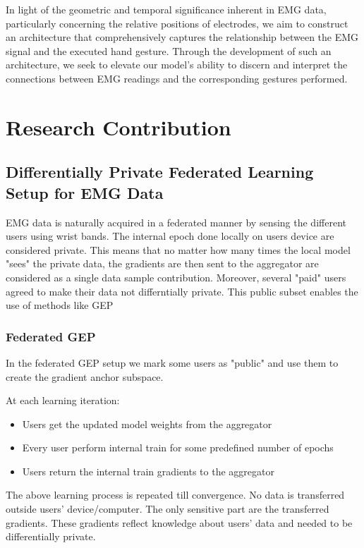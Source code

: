 \documentclass[fourier]{_style/dissertation}
\begin{document}

In light of the geometric and temporal significance inherent in EMG data, particularly concerning the relative positions of electrodes, we aim to construct an architecture that comprehensively captures the relationship between the EMG signal and the executed hand gesture. Through the development of such an architecture, we seek to elevate our model's ability to discern and interpret the connections between EMG readings and the corresponding gestures performed.

\chapter{Research Contribution}
\section{Differentially Private Federated Learning  Setup for EMG Data }
EMG data is naturally acquired in a federated manner by sensing the different users using wrist bands. The internal epoch done locally on users device are considered private. This means that no matter how many times the local model "sees" the private data, the gradients are then sent to the aggregator are considered as a single data sample contribution. Moreover, several "paid" users agreed to make their data not differntially private. This public subset enables the use of methods like GEP \cite{Yu2021DoLearning} 
\subsection{Federated GEP}
In the federated GEP setup we mark some users as "public" and use them to create the gradient anchor subspace. 

At each learning iteration:
\begin{itemize}
    \item Users get the updated model weights from the aggregator
    \item Every user perform internal train for some predefined number of epochs
    \item Users return the internal train gradients to the aggregator
\end{itemize}
 The above learning process is repeated till convergence. No data is transferred outside users' device/computer. The only sensitive part are the transferred gradients. These gradients reflect knowledge about users' data and needed to be differentially private.
\end{document}
